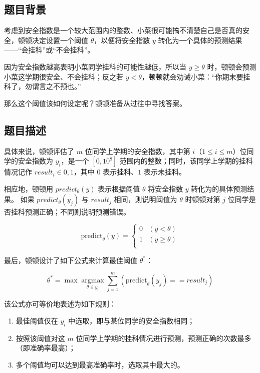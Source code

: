 \subsection*{题目背景}

考虑到安全指数是一个较大范围内的整数、小菜很可能搞不清楚自己是否真的安全，顿顿决定设置一个阈值 $\theta$，以便将安全指数 $y$ 转化为一个具体的预测结果——“会挂科”或“不会挂科”。

因为安全指数越高表明小菜同学挂科的可能性越低，所以当 $y \ge \theta$ 时，顿顿会预测小菜这学期很安全、不会挂科；反之若 $y < \theta$，顿顿就会劝诫小菜：“你期末要挂科了，勿谓言之不预也。”

那么这个阈值该如何设定呢？顿顿准备从过往中寻找答案。


\subsection*{题目描述}

具体来说，顿顿评估了 $m$ 位同学上学期的安全指数，其中第 $i$（$1 \le i \le m$）位同学的安全指数为 $y_i$，是一个 $[ 0, 10^8 ]$ 范围内的整数；同时，该同学上学期的挂科情况记作 $result_i \in { 0, 1 }$，其中 $0$ 表示挂科、$1$ 表示未挂科。

相应地，顿顿用 $predict_{\theta} ( y )$ 表示根据阈值 $\theta$ 将安全指数 $y$ 转化为的具体预测结果。
如果 $predict_{\theta} ( y_j )$ 与 $result_j$ 相同，则说明阈值为 $\theta$ 时顿顿对第 $j$ 位同学是否挂科预测正确；不同则说明预测错误。

\begin{equation*}
    \mathrm{predict}_{\theta} ( y ) =
    \begin{cases}
        0 & (y < \theta)   \\
        1 & (y \ge \theta) \\
    \end{cases}
\end{equation*}


最后，顿顿设计了如下公式来计算最佳阈值 $\theta^*$：

\begin{equation*}
    \theta^* = \max { \mathop{\mathrm{argmax} }\limits_{\theta \in { y_i } } \sum\limits_{j=1}^{m} ( \mathrm{predict}_{\theta} ( y_j ) == result_j ) }
\end{equation*}


该公式亦可等价地表述为如下规则：

\begin{enumerate}

    \item 最佳阈值仅在 ${ y_i }$ 中选取，即与某位同学的安全指数相同；
    \item 按照该阈值对这 $m$ 位同学上学期的挂科情况进行预测，预测正确的次数最多（即准确率最高）；



    \item 多个阈值均可以达到最高准确率时，选取其中最大的。



\end{enumerate}


